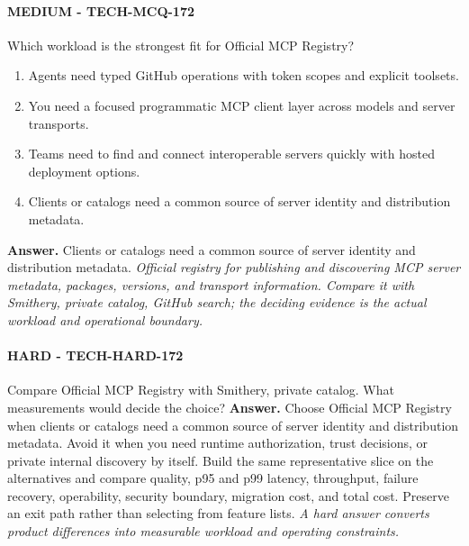 \paragraph{MEDIUM - TECH-MCQ-172} Which workload is the strongest fit for Official MCP Registry?
\begin{enumerate}[label=\Alph*.]
\item Agents need typed GitHub operations with token scopes and explicit toolsets.
\item You need a focused programmatic MCP client layer across models and server transports.
\item Teams need to find and connect interoperable servers quickly with hosted deployment options.
\item Clients or catalogs need a common source of server identity and distribution metadata.
\end{enumerate}
\textbf{Answer.} Clients or catalogs need a common source of server identity and distribution metadata.
\textit{Official registry for publishing and discovering MCP server metadata, packages, versions, and transport information. Compare it with Smithery, private catalog, GitHub search; the deciding evidence is the actual workload and operational boundary.}
\paragraph{HARD - TECH-HARD-172} Compare Official MCP Registry with Smithery, private catalog. What measurements would decide the choice?
\textbf{Answer.} Choose Official MCP Registry when clients or catalogs need a common source of server identity and distribution metadata. Avoid it when you need runtime authorization, trust decisions, or private internal discovery by itself. Build the same representative slice on the alternatives and compare quality, p95 and p99 latency, throughput, failure recovery, operability, security boundary, migration cost, and total cost. Preserve an exit path rather than selecting from feature lists.
\textit{A hard answer converts product differences into measurable workload and operating constraints.}
